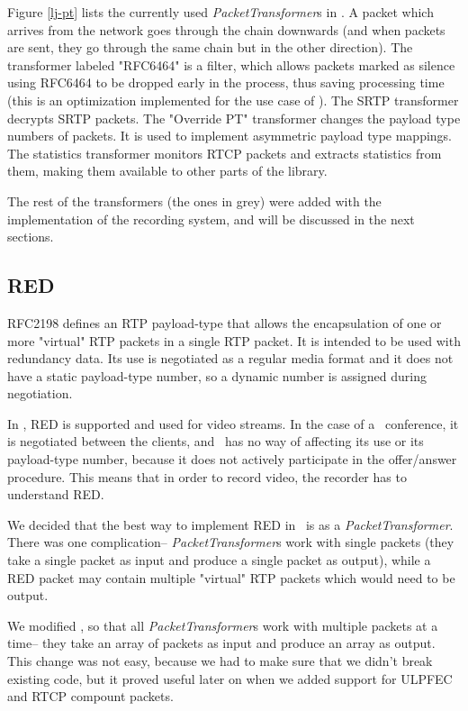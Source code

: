 \documentclass[twoside,openright,a4paper,12pt,english]{article}
\begin{document}
Figure \ref{lj-pt} lists the currently used \emph{PacketTransformer}s in \lj. A
packet which arrives from the network goes through the chain downwards (and
when packets are sent, they go through the same chain but in the other
direction). The transformer labeled "RFC6464" is a filter, which allows packets
marked as silence using RFC6464\cite{rfc6464} to be dropped early in the
process, thus saving processing time (this is an optimization implemented for
the use case of \jvb). The SRTP transformer decrypts SRTP packets. The
"Override PT" transformer changes the payload type numbers of packets. It is
used to implement asymmetric payload type mappings. The statistics transformer
monitors RTCP packets and extracts statistics from them, making them available
to other parts of the library.

The rest of the transformers (the ones in grey) were added with the
implementation of the recording system, and will be discussed in the next
sections.




\subsection{RED}
\label{red}
RFC2198\cite{red} defines an RTP payload-type that allows the encapsulation of
one or more "virtual" RTP packets in a single RTP packet. It is intended to be
used with redundancy data. Its use is negotiated as a regular media format and
it does not have a static payload-type number, so a dynamic number is assigned
during negotiation.

In \wrtc, RED is supported and used for video streams. In the case of a \jm\
conference, it is negotiated between the clients, and \jvb\ has no way of
affecting its use or its payload-type number, because it does not actively
participate in the offer/answer procedure. This means that in order to record
video, the recorder has to understand RED.

\smallskip
We decided that the best way to implement RED in \lj\ is as
a \emph{PacketTransformer}. There was one complication--
\emph{PacketTransformer}s work with single packets (they take a single packet
as input and produce a single packet as output), while a RED packet may contain
multiple "virtual" RTP packets which would need to be output.

We modified \lj, so that all \emph{PacketTransformer}s work with multiple
packets at a time-- they take an array of packets as input and produce an array
as output. This change was not easy, because we had to make sure that we didn't
break existing code, but it proved useful later on when we added support for
ULPFEC and RTCP compount packets.
\end{document}
